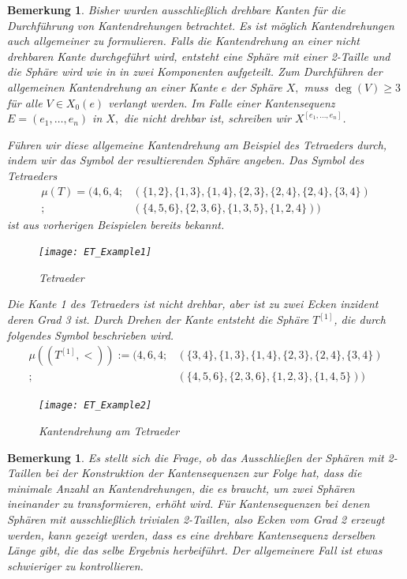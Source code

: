 \documentclass[12pt,titlepage,twoside,cleardoublepage]{article}
\theoremstyle{nummermitklammern}
\newtheorem{bemerkung}[temp]{Bemerkung}
\newtheorem{bemerkung}[zahl]{Bemerkung}
\numberwithin{equation}{section}
\begin{document}
\begin{bemerkung}
Bisher wurden ausschließlich drehbare Kanten für die Durchführung von Kantendrehungen betrachtet. Es ist möglich Kantendrehungen auch allgemeiner zu formulieren. Falls die Kantendrehung an einer nicht drehbaren Kante durchgeführt wird, entsteht eine Sphäre mit einer 2-Taille und die Sphäre wird wie in  in zwei Komponenten aufgeteilt.  Zum Durchführen der allgemeinen Kantendrehung an einer Kante $e$ der Sphäre $X,$ muss $\deg(V)\geq 3$ für alle $V\in X_0(e)$ verlangt werden. Im Falle einer Kantensequenz $E=(e_1,\ldots,e_n)$ in $X,$ die nicht drehbar ist, schreiben wir $X^{[e_1,\ldots,e_n]}$.

 Führen wir diese allgemeine Kantendrehung am Beispiel des Tetraeders durch, indem wir das Symbol der resultierenden Sphäre angeben. Das Symbol des Tetraeders
\begin{align*}
\mu(T)=(4,6,4;&(\{1,2\}, \{1,3\},\{1,4\},\{2,3\},\{2,4\},\{2,4\},\{3,4\})\\
;&(\{4,5,6\},\{2,3,6\},\{1,3,5\},\{1,2,4\}))
\end{align*} ist aus vorherigen Beispielen bereits bekannt.
\begin{figure}[H]
\begin{center}
\texttt{[image: ET\_Example1]}
\end{center}
\caption{Tetraeder}
\end{figure}
Die Kante 1 des Tetraeders ist nicht drehbar, aber ist zu zwei Ecken inzident deren Grad 3 ist. Durch Drehen der Kante entsteht die Sphäre $T^{[1]}$, die durch folgendes Symbol beschrieben wird.
\begin{align*}
\mu ((T^{[1]},<)):=(4,6,4;&(\{3,4\},\{1,3\},\{1,4\},\{2,3\},\{2,4\},\{3,4\})\\
;&(\{4,5,6\},\{2,3,6\},\{1,2,3\},\{1,4,5\}))
\end{align*}
\begin{figure}[H]
\begin{center}
\texttt{[image: ET\_Example2]}
\end{center}
\caption{Kantendrehung am Tetraeder}
\end{figure}

\end{bemerkung}

\begin{bemerkung}
Es stellt sich die Frage, ob das Ausschließen der Sphären mit 2-Taillen bei der Konstruktion der Kantensequenzen zur Folge hat, dass die minimale Anzahl an Kantendrehungen, die es braucht, um zwei Sphären ineinander zu transformieren, erhöht wird. Für Kantensequenzen bei denen Sphären mit ausschließlich trivialen 2-Taillen, also Ecken vom Grad 2 erzeugt werden, kann gezeigt werden, dass es eine drehbare Kantensequenz derselben Länge gibt, die das selbe Ergebnis herbeiführt. Der allgemeinere Fall ist etwas schwieriger zu kontrollieren.
\end{bemerkung}
\end{document}
